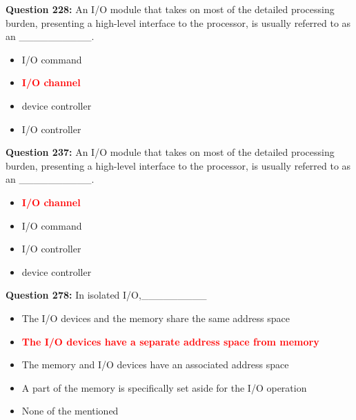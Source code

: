 \documentclass[12pt,a4paper]{article}
\begin{document}
\vspace{0.5cm}

\textbf{Question 228:} An I/O module that takes on most of the detailed processing burden, presenting a high-level interface to the processor, is usually referred to as an __________.

\begin{itemize}
    \item[\textbf{A.}] I/O command
    \item[\textbf{B.}] \textcolor{red}{\textbf{I/O channel}}
    \item[\textbf{C.}] device controller
    \item[\textbf{D.}] I/O controller
\end{itemize}

\vspace{0.5cm}

\textbf{Question 237:} An I/O module that takes on most of the detailed processing burden, presenting a high-level interface to the processor, is usually referred to as an __________.

\begin{itemize}
    \item[\textbf{A.}] \textcolor{red}{\textbf{I/O channel}}
    \item[\textbf{B.}] I/O command
    \item[\textbf{C.}] I/O controller
    \item[\textbf{D.}] device controller
\end{itemize}

\vspace{0.5cm}

\textbf{Question 278:} In isolated I/O,_________

\begin{itemize}
    \item[\textbf{A.}] The I/O devices and the memory share the same address space
    \item[\textbf{B.}] \textcolor{red}{\textbf{The I/O devices have a separate address space from memory}}
    \item[\textbf{C.}] The memory and I/O devices have an associated address space
    \item[\textbf{D.}] A part of the memory is specifically set aside for the I/O operation
    \item[\textbf{E.}] None of the mentioned
\end{itemize}

\vspace{0.5cm}
\end{document}
